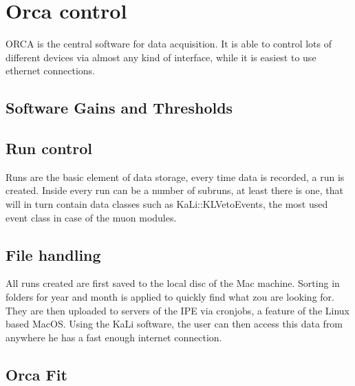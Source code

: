 
\section{Orca control}
\label{ch:OrcaControl}
    ORCA is the central software for data acquisition. It is able to control lots of different devices via almost any kind of interface, while it is easiest to use ethernet connections. 

    \subsection{Software Gains and Thresholds}
    \label{ch:OrcaControl:sec:SoftwareGainsThresholds}
    
    
    \subsection{Run control}
    \label{ch:OrcaControl:sec:RunControl}
    Runs are the basic element of data storage, every time data is recorded, a run is created. Inside every run can be a number of subruns, at least there is one, that will in turn contain data classes such as KaLi::KLVetoEvents, the most used event class in case of the muon modules.
    
    \subsection{File handling}
    \label{ch:OrcaControl:sec:FileHandling}
    All runs created are first saved to the local disc of the Mac machine. Sorting in folders for year and month is applied to quickly find what zou are looking for. They are then uploaded to servers of the IPE via cronjobs, a feature of the Linux based MacOS. Using the KaLi software, the user can then access this data from anywhere he has a fast enough internet connection.
    
    \subsection{Orca Fit}
    \label{ch:OrcaControl:sec:OrcaFit}

